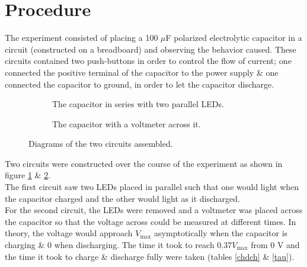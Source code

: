\documentclass{report}
\begin{document}
\section{Procedure}
	The experiment consisted of placing a 100 $\mu$F polarized electrolytic capacitor in a circuit (constructed on a breadboard) and observing the behavior caused. These circuits contained two push-buttons in order to control the flow of current; one connected the positive terminal of the capacitor to the power supply \& one connected the capacitor to ground, in order to let the capacitor discharge.
	\begin{figure}[H]
		\begin{subfigure}{0.5\textwidth}
			
			\caption{The capacitor in series with two parallel LEDs.}
			\label{circuit1}
		\end{subfigure}
		\begin{subfigure}{0.5\textwidth}
			
			\caption{The capacitor with a voltmeter across it.}
			\label{circuit2}
		\end{subfigure}
		\caption{Diagrams of the two circuits assembled.}
		\label{diagrams}
	\end{figure}
	Two circuits were constructed over the course of the experiment as shown in figure \ref{circuit1} \& \ref{circuit2}.\\
	The first circuit saw two LEDs placed in parallel such that one would light when the capacitor charged and the other would light as it discharged.\\
	For the second circuit, the LEDs were removed and a voltmeter was placed across the capacitor so that the voltage across could be measured at different times. In theory, the voltage would approach $V_\mathrm{max}$ asymptotically when the capacitor is charging \& 0 when discharging.
	The time it took to reach $0.37V_\mathrm{max}$ from 0 V and the time it took to charge \& discharge fully were taken (tables \ref{chdch} \& \ref{tau}).
\end{document}
